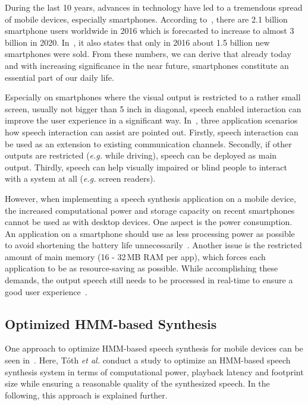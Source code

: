 During the last 10 years, advances in technology have led to a tremendous spread of mobile devices, especially smartphones. According to~\cite{statista:smartphones}, there are 2.1 billion smartphone users worldwide in 2016 which is forecasted to increase to almost 3 billion in 2020. In~\cite{statista:smartphones}, it also states that only in 2016 about 1.5 billion new smartphones were sold. From these numbers, we can derive that already today and with increasing significance in the near future, smartphones constitute an essential part of our daily life.

Especially on smartphones where the visual output is restricted to a rather small screen, usually not bigger than 5 inch in diagonal, speech enabled interaction can improve the user experience in a significant way. In~\cite{toth:optimizing}, three application scenarios how speech interaction can assist are pointed out. Firstly, speech interaction can be used as an extension to existing communication channels. Secondly, if other outputs are restricted (\textit{e.g.} while driving), speech can be deployed as main output. Thirdly, speech can help visually impaired or blind people to interact with a system at all (\textit{e.g.} screen readers).

However, when implementing a speech synthesis application on a mobile device, the increased computational power and storage capacity on recent smartphones cannot be used as with desktop devices. One aspect is the power consumption. An application on a smartphone should use as less processing power as possible to avoid shortening the battery life unnecessarily~\cite{toth:optimizing}. Another issue is the restricted amount of main memory (16 - 32\,MB RAM per app), which forces each application to be as resource-saving as possible. While accomplishing these demands, the output speech still needs to be processed in real-time to ensure a good user experience~\cite{boros:robust}.

\subsection{Optimized \ac{HMM}-based Synthesis}
\label{subsec:hmmembedded}

One approach to optimize \ac{HMM}-based speech synthesis for mobile devices can be seen in~\cite{toth:optimizing}. Here, T\'oth \textit{et al.} conduct a study to optimize an \ac{HMM}-based speech synthesis system in terms of computational power, playback latency and footprint size while ensuring a reasonable quality of the synthesized speech. In the following, this approach is explained further.

